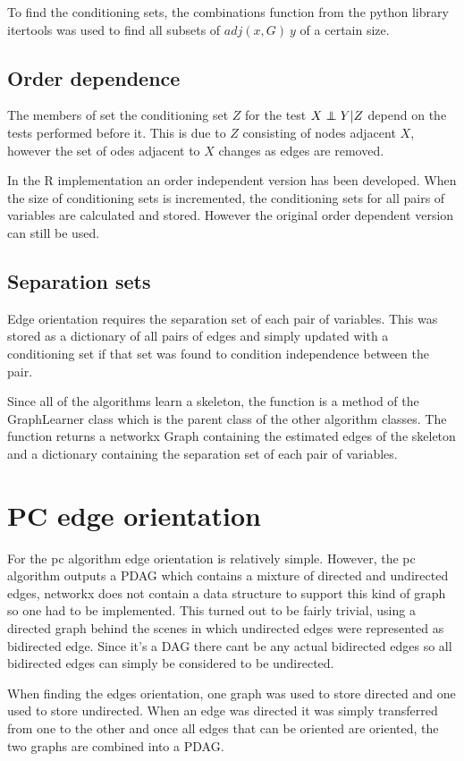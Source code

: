 \documentclass{UoYCSproject}
\newcommand\independent{\protect\mathpalette{\protect\independenT}{\perp}}
\def\independenT#1#2{\mathrel{\rlap{$#1#2$}\mkern2mu{#1#2}}}
\begin{document}
To find the conditioning sets, the combinations function from the python library itertools was used to find all subsets of $adj(x,G)\ y$ of a certain size.

\subsection{Order dependence}
The members of set the conditioning set $ Z $ for the test $X \independent Y|Z$ depend on the tests performed before it. This is due to $Z$ consisting of nodes adjacent $X$, however the set of odes adjacent to $X$ changes as edges are removed.

In the R implementation an order independent version has been developed. When the size of conditioning sets is incremented, the conditioning sets for all pairs of variables  are calculated and stored. However the original order dependent version can still be used.

\subsection{Separation sets}
Edge orientation requires the separation set of each pair of variables. This was stored as a dictionary of all pairs of edges and simply updated with a conditioning set if that set was found to condition independence between the pair.

Since all of the algorithms learn a skeleton, the function is a method of the GraphLearner class which is the parent class of the other algorithm classes. The function returns a networkx Graph containing the estimated edges of the skeleton and a dictionary containing the separation set of each pair of variables.

\section{PC edge orientation}
For the pc algorithm edge orientation is relatively simple. However, the pc algorithm outputs a PDAG which contains a mixture of directed and undirected edges, networkx does not contain a data structure to support this kind of graph so one had to be implemented. This turned out to be fairly trivial, using a directed graph behind the scenes in which undirected edges were represented as bidirected edge. Since it's a DAG there cant be any actual bidirected edges so all bidirected edges can simply be considered to be undirected.

When finding the edges orientation, one graph was used to store directed and one used to store undirected. When an edge was directed it was simply transferred from one to the other and once all edges that can be oriented are oriented, the two graphs are combined into a PDAG.
\end{document}
